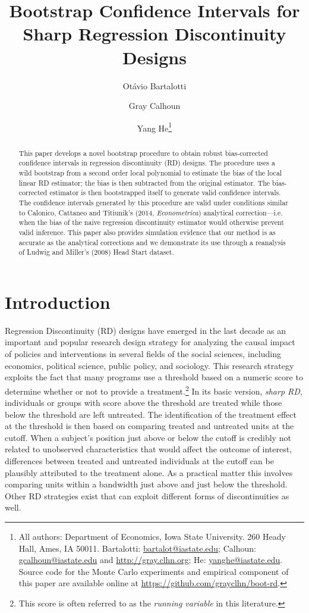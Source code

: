 \documentclass[12pt,fleqn]{article}
\title{Bootstrap Confidence Intervals for Sharp Regression Discontinuity Designs}
\author{Ot\'avio Bartalotti \and Gray Calhoun \and Yang He\thanks{%
  All authors: Department of Economics, Iowa State University.
  260 Heady Hall, Ames, IA 50011.
  Bartalotti: \protect\url{bartalot@iastate.edu};
  Calhoun: \protect\url{gcalhoun@iastate.edu} and
  \protect\url{http://gray.clhn.org};
  He: \protect\url{yanghe@iastate.edu}. Source code for the Monte Carlo
  experiments and empirical component of this paper are available online
  at \protect\url{https://github.com/grayclhn/boot-rd}.}}
\begin{document}
\maketitle

\begin{abstract}\noindent
  This paper develops a novel bootstrap procedure to obtain robust
  bias-corrected confidence intervals in regression discontinuity (RD) designs. The procedure uses a wild bootstrap from a
  second order local polynomial to estimate the bias of the local linear RD
  estimator; the bias is then subtracted from the original estimator. The
  bias-corrected estimator is then bootstrapped itself to generate valid
  confidence intervals. The confidence intervals generated by this procedure
  are valid under conditions similar to Calonico, Cattaneo and Titiunik's
  (2014, \textit{Econometrica}) analytical correction---i.e.  when the bias of
  the naive regression discontinuity estimator would otherwise prevent valid
  inference. This paper also provides simulation evidence that our method is
  as accurate as the analytical corrections and we demonstrate its use through
  a reanalysis of Ludwig and Miller's (2008) Head Start dataset.
\end{abstract}

\section{Introduction}
Regression Discontinuity (RD) designs have emerged in the last decade as an
important and popular research design strategy for analyzing the causal impact
of policies and interventions in several fields of the social sciences,
including economics, political science, public policy, and sociology.  This
research strategy exploits the fact that many programs use a threshold based
on a numeric score to determine whether or not to provide a
treatment.\footnote{This score is often referred to as the \textit{running variable} in this
  literature.}
In its basic version, \textit{sharp RD}, individuals or groups with score
above the threshold are treated while those below the threshold are left
untreated. The identification of the treatment effect at the threshold is then
based on comparing treated and untreated units at the cutoff. When a subject's
position just above or below the cutoff is credibly not related to unobserved
characteristics that would affect the outcome of interest, differences between
treated and untreated individuals at the cutoff can be plausibly attributed to
the treatment alone. As a practical matter this involves comparing units
within a bandwidth just above and just below the threshold. Other RD
strategies exist that can exploit different forms of discontinuities as well.
\end{document}
